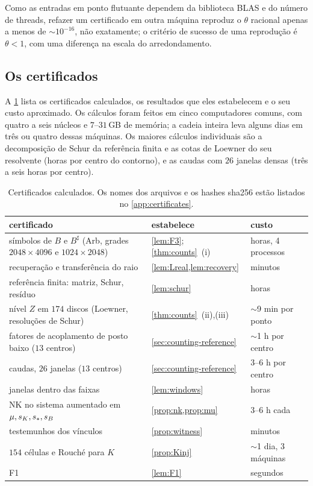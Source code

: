Como as entradas em ponto flutuante dependem da biblioteca BLAS e do número de threads, refazer um
certificado em outra máquina reproduz o $\theta$ racional apenas a menos de $\sim10^{-16}$, não exatamente; o
critério de sucesso de uma reprodução é $\theta<1$, com uma diferença na escala do arredondamento.

\subsection{Os certificados}\label{sec:computation-certs}

A \cref{tab:certs} lista os certificados calculados, os resultados que eles estabelecem e o seu custo aproximado. Os
cálculos foram feitos em cinco computadores comuns, com quatro a seis núcleos e $7$--$31$\,GB de memória; a cadeia
inteira leva alguns dias em três ou quatro dessas máquinas. Os maiores cálculos individuais são a decomposição de Schur
da referência finita e as cotas de Loewner do seu resolvente (horas por centro do contorno), e as
caudas com $26$ janelas densas (três a seis horas por centro).

\begin{table}[ht]
\centering
\small
\begin{tabular}{@{}p{}p{}p{}@{}}
\toprule
certificado & estabelece & custo \\
\midrule
símbolos de $B$ e $B^\sharp$ (Arb, grades $2048\times4096$ e $1024\times2048$) & \cref{lem:F3}; \cref{thm:counts}~(i) & horas, 4 processos \\
recuperação e transferência do raio & \cref{lem:Lreal,lem:recovery} & minutos \\
referência finita: matriz, Schur, resíduo & \cref{lem:schur} & horas \\
nível $Z$ em $174$ discos (Loewner, resoluções de Schur) & \cref{thm:counts}~(ii),(iii) & $\sim$9 min por ponto \\
fatores de acoplamento de posto baixo ($13$ centros) & \cref{sec:counting-reference} & $\sim$1 h por centro \\
caudas, $26$ janelas ($13$ centros) & \cref{sec:counting-reference} & 3--6 h por centro \\
janelas dentro das faixas & \cref{lem:windows} & horas \\
NK no sistema aumentado em $\mu,s_{K},s_{\ast},s_{B}$ & \cref{prop:nk,prop:mu} & 3--6 h cada \\
testemunhos dos vínculos & \cref{prop:witness} & minutos \\
$154$ células e Rouch\'e para $K$ & \cref{prop:Kinj} & $\sim$1 dia, 3 máquinas \\
F1 & \cref{lem:F1} & segundos \\
\bottomrule
\end{tabular}
\caption{Certificados calculados. Os nomes dos arquivos e os hashes sha256 estão listados no \cref{app:certificates}.}
\label{tab:certs}
\end{table}

